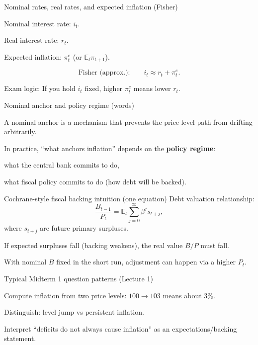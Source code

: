 \documentclass[aspectratio=169,xcolor=dvipsnames]{beamer}
\let\tempone\itemize
\let\temptwo\enditemize
\renewenvironment{itemize}{\tempone\addtolength{\itemsep}{\fill}}{\temptwo}
\begin{document}
\begin{frame}{Nominal rates, real rates, and expected inflation (Fisher)}
\begin{itemize}
\item Nominal interest rate: $i_t$.
\item Real interest rate: $r_t$.
\item Expected inflation: $\pi_t^e$ (or $\mathbb{E}_t\pi_{t+1}$).
\end{itemize}

\[
\text{Fisher (approx.):}\qquad i_t \approx r_t+\pi_t^e.
\]

\begin{itemize}
\item Exam logic: If you hold $i_t$ fixed, higher $\pi_t^e$ means lower $r_t$.
\end{itemize}
\end{frame}

\begin{frame}{Nominal anchor and policy regime (words)}
\begin{itemize}
\item A nominal anchor is a mechanism that prevents the price level path from drifting arbitrarily.
\item In practice, ``what anchors inflation'' depends on the \textbf{policy regime}:
\begin{itemize}
\item what the central bank commits to do,
\item what fiscal policy commits to do (how debt will be backed).
\end{itemize}
\end{itemize}
\end{frame}

\begin{frame}{Cochrane-style fiscal backing intuition (one equation)}
\small
Debt valuation relationship:
\[
\frac{B_{t-1}}{P_t}=\mathbb{E}_t\sum_{j=0}^{\infty}\beta^j s_{t+j},
\]
where $s_{t+j}$ are future primary surpluses.

\begin{itemize}
\item If expected surpluses fall (backing weakens), the real value $B/P$ must fall.
\item With nominal $B$ fixed in the short run, adjustment can happen via a higher $P_t$.
\end{itemize}
\end{frame}

\begin{frame}{Typical Midterm 1 question patterns (Lecture 1)}
\begin{itemize}
\item Compute inflation from two price levels: $100\to 103$ means about $3\%$.
\item Distinguish: level jump vs persistent inflation.
\item Interpret ``deficits do not always cause inflation'' as an expectations/backing statement.
\end{itemize}
\end{frame}
\end{document}
